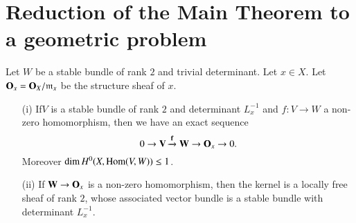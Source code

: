 \section{Reduction of the Main Theorem to a geometric problem}\label{art17-sec7}

\begin{lemma}\label{art17-lem7.1}
Let $W$ be a stable bundle of rank $2$ and trivial determinant. Let $x\in X$. Let $\mathbf{O}_{x}=\mathbf{O}_{X}/\mathfrak{m}_{x}$ be the structure sheaf of $x$.
\begin{itemize}
\item[\rm(i)] If\pageoriginale $V$ is a stable bundle of rank $2$ and determinant $L^{-1}_{x}$ and $f:V\to W$ a non-zero homomorphism, then we have an exact sequence
$$
0\to \mathbf{V}\xrightarrow{\mathbf{f}}\mathbf{W}\to \mathbf{O}_{x}\to 0.
$$
Moreover $\dim H^{0}(X,\operatorname{\mathrm{Hom}}(V,W))\leq 1$.

\item[\rm(ii)] If $\mathbf{W}\to \mathbf{O}_{x}$ is a non-zero homomorphism, then the kernel is a locally free sheaf of rank $2$, whose associated vector bundle is a stable bundle with determinant $L^{-1}_{x}$.
\end{itemize}
\end{lemma}


